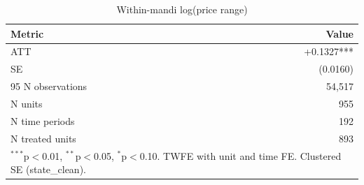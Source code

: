 \begin{table}[htbp]
\centering
\caption{Within-mandi log(price range)}
\label{tab:spec1_within_mandi_pooled}
\begin{tabular}{lr}
\hline\hline
Metric & Value \\
\hline
ATT & +0.1327*** \\
SE & (0.0160) \\
95%
N observations & 54,517 \\
N units & 955 \\
N time periods & 192 \\
N treated units & 893 \\
\hline\hline
\multicolumn{2}{l}{\footnotesize $^{***}$p$<$0.01, $^{**}$p$<$0.05, $^{*}$p$<$0.10. TWFE with unit and time FE. Clustered SE (state_clean).} \\
\end{tabular}
\end{table}
